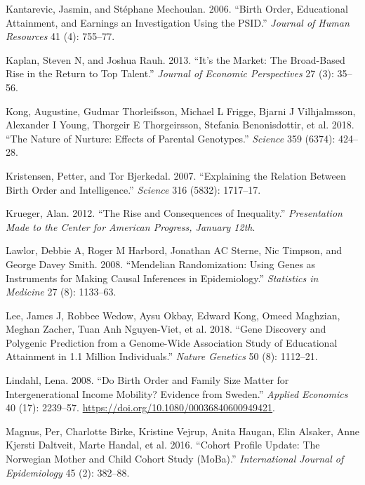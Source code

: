 \documentclass[
  12pt,
]{article}
\newlength{\cslhangindent}
\newlength{\cslentryspacingunit} %
\newenvironment{CSLReferences}[2] %
 {%
  \setlength{\parindent}{0pt}
  \ifodd #1
  \let\oldpar\par
  \def\par{\hangindent=\cslhangindent\oldpar}
  \fi
  \setlength{\parskip}{#2\cslentryspacingunit}
 }%
 {}
\theoremstyle{definition}
\theoremstyle{definition}
\theoremstyle{definition}
\theoremstyle{definition}
\theoremstyle{remark}
\begin{document}
\begin{CSLReferences}{1}{0}
\leavevmode{}%
Kantarevic, Jasmin, and Stéphane Mechoulan. 2006. {``Birth Order, Educational Attainment, and Earnings an Investigation Using the PSID.''} \emph{Journal of Human Resources} 41 (4): 755--77.

\leavevmode{}%
Kaplan, Steven N, and Joshua Rauh. 2013. {``It's the Market: The Broad-Based Rise in the Return to Top Talent.''} \emph{Journal of Economic Perspectives} 27 (3): 35--56.

\leavevmode{}%
Kong, Augustine, Gudmar Thorleifsson, Michael L Frigge, Bjarni J Vilhjalmsson, Alexander I Young, Thorgeir E Thorgeirsson, Stefania Benonisdottir, et al. 2018. {``The Nature of Nurture: Effects of Parental Genotypes.''} \emph{Science} 359 (6374): 424--28.

\leavevmode{}%
Kristensen, Petter, and Tor Bjerkedal. 2007. {``Explaining the Relation Between Birth Order and Intelligence.''} \emph{Science} 316 (5832): 1717--17.

\leavevmode{}%
Krueger, Alan. 2012. {``The Rise and Consequences of Inequality.''} \emph{Presentation Made to the Center for American Progress, January 12th}.

\leavevmode{}%
Lawlor, Debbie A, Roger M Harbord, Jonathan AC Sterne, Nic Timpson, and George Davey Smith. 2008. {``Mendelian Randomization: Using Genes as Instruments for Making Causal Inferences in Epidemiology.''} \emph{Statistics in Medicine} 27 (8): 1133--63.

\leavevmode{}%
Lee, James J, Robbee Wedow, Aysu Okbay, Edward Kong, Omeed Maghzian, Meghan Zacher, Tuan Anh Nguyen-Viet, et al. 2018. {``Gene Discovery and Polygenic Prediction from a Genome-Wide Association Study of Educational Attainment in 1.1 Million Individuals.''} \emph{Nature Genetics} 50 (8): 1112--21.

\leavevmode{}%
Lindahl, Lena. 2008. {``Do Birth Order and Family Size Matter for Intergenerational Income Mobility? Evidence from Sweden.''} \emph{Applied Economics} 40 (17): 2239--57. \url{https://doi.org/10.1080/00036840600949421}.

\leavevmode{}%
Magnus, Per, Charlotte Birke, Kristine Vejrup, Anita Haugan, Elin Alsaker, Anne Kjersti Daltveit, Marte Handal, et al. 2016. {``Cohort Profile Update: The Norwegian Mother and Child Cohort Study (MoBa).''} \emph{International Journal of Epidemiology} 45 (2): 382--88.


\end{CSLReferences}
\end{document}
